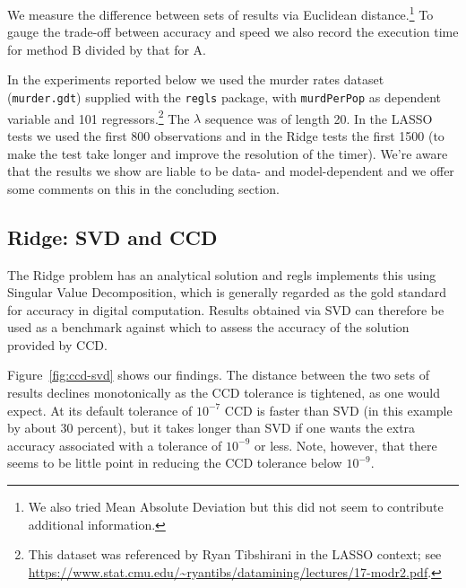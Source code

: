 \documentclass{article}
\begin{document}
We measure the difference between sets of results via Euclidean
distance.\footnote{We also tried Mean Absolute Deviation but this did
  not seem to contribute additional information.}  To gauge the
trade-off between accuracy and speed we also record the execution time
for method B divided by that for A.

In the experiments reported below we used the murder rates dataset
(\texttt{murder.gdt}) supplied with the \texttt{regls} package, with
\texttt{murdPerPop} as dependent variable and 101
regressors.\footnote{This dataset was referenced by Ryan Tibshirani in
  the LASSO context; see
  \url{https://www.stat.cmu.edu/~ryantibs/datamining/lectures/17-modr2.pdf}.}
The $\lambda$ sequence was of length 20. In the LASSO tests we used
the first 800 observations and in the Ridge tests the first 1500 (to
make the test take longer and improve the resolution of the
timer). We're aware that the results we show are liable to be data-
and model-dependent and we offer some comments on this in the
concluding section.

\subsection{Ridge: SVD and CCD}

The Ridge problem has an analytical solution and \textsf{regls}
implements this using Singular Value Decomposition, which is generally
regarded as the gold standard for accuracy in digital
computation. Results obtained via SVD can therefore be used as a
benchmark against which to assess the accuracy of the solution
provided by CCD.

Figure~\ref{fig:ccd-svd} shows our findings. The distance between the
two sets of results declines monotonically as the CCD tolerance is
tightened, as one would expect. At its default tolerance of $10^{-7}$
CCD is faster than SVD (in this example by about 30 percent), but it
takes longer than SVD if one wants the extra accuracy associated with
a tolerance of $10^{-9}$ or less. Note, however, that there seems to
be little point in reducing the CCD tolerance below $10^{-9}$.
\end{document}
